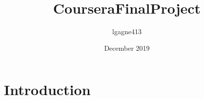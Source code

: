 \documentclass{article}
\title{CourseraFinalProject}
\author{lgagne413 }
\date{December 2019}
\begin{document}
\maketitle

\section{Introduction}
\end{document}
